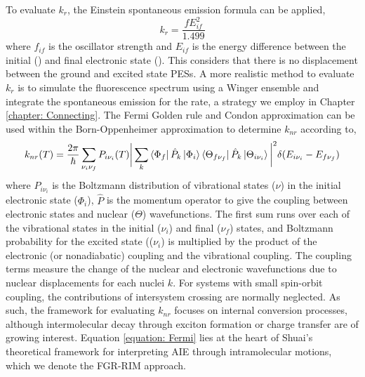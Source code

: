 To evaluate $k_{r}$, the Einstein spontaneous emission formula can be applied,\cite{Yui2005}
\begin{equation}
    k_{r}=\frac{fE_{if}^{2}}{1.499}
\end{equation}
where $f_{if}$ is the oscillator strength and $E_{if}$ is the energy difference between the initial (\sone{}) and final electronic state (\szero{}). This considers that there is no displacement between the ground and excited state \acp{PES}. A more realistic method to evaluate $k_{r}$ is to simulate the fluorescence spectrum using a Winger ensemble and integrate the spontaneous emission for the rate,  a strategy we employ in Chapter \ref{chapter: Connecting}.\cite{Crespo-Otero2012} The Fermi Golden rule and Condon approximation can be used within the Born-Oppenheimer approximation to determine $k_{nr}$ according to,
\begin{equation}\label{equation: Fermi}
    k_{nr}(T)=\frac{2\pi}{\hbar}\sum_{\nu_{i}\nu_{f}}P_{i\nu_{i}}(T)\bigg|\sum_{k}\bra{\Phi_{f}}\hat{P}_{k}\ket{\Phi_{i}}\bra{\Theta_{f\nu_{f}}}\hat{P}_{k}\ket{\Theta_{i\nu_{i}}}\bigg|^{2}\delta{}(E_{i\nu_{i}}-E_{f\nu_{f}})
\end{equation}
where $P_{i\nu_{i}}$ is the Boltzmann distribution of vibrational states ($\nu$) in the initial electronic state ($\Phi_{i}$), $\hat{P}$ is the momentum operator to give the coupling between electronic states and nuclear ($\Theta$) wavefunctions. The first sum runs over each of the vibrational states in the initial ($\nu_{i}$) and final ($\nu_{f}$)  states, and Boltzmann probability for the excited state (($\nu_{i}$) is multiplied by the product of the electronic (or nonadiabatic) coupling and the vibrational coupling. The coupling terms measure the change of the nuclear and electronic wavefunctions due to nuclear displacements for each nuclei $k$. For systems with small spin-orbit coupling, the contributions of intersystem crossing are normally neglected. As such, the framework for evaluating $k_{nr}$ focuses on internal conversion processes, although intermolecular decay through exciton formation or charge transfer are of growing interest.\cite{Li2017} Equation \ref{equation: Fermi} lies at the heart of Shuai's theoretical framework for interpreting AIE through intramolecular motions, which we denote the \ac{FGR-RIM} approach.

